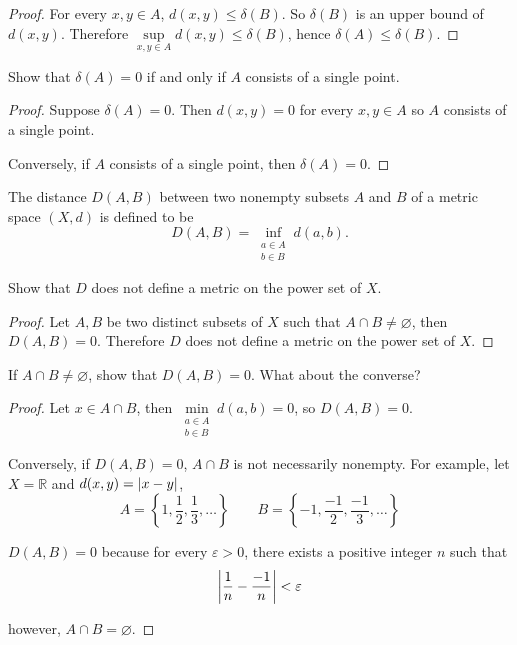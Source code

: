 \begin{proof}
    For every $x, y\in A$, $d(x, y) \leq \delta(B)$. So $\delta(B)$ is an upper bound of $d(x, y)$. Therefore $\sup\limits_{x,y\in A} d(x, y)\leq \delta(B)$, hence $\delta(A)\leq \delta(B)$.
\end{proof}

\begin{exercise}\label{chapter1:section2:exercise7}
    Show that $\delta(A) = 0$ if and only if $A$ consists of a single point.
\end{exercise}

\begin{proof}
    Suppose $\delta(A) = 0$. Then $d(x, y) = 0$ for every $x, y\in A$ so $A$ consists of a single point.

    Conversely, if $A$ consists of a single point, then $\delta(A) = 0$.
\end{proof}

\begin{exercise}\label{chapter1:section2:exercise8}
    The distance $D(A, B)$ between two nonempty subsets $A$ and $B$ of a metric space $(X, d)$ is defined to be
    \[
        D(A, B) = \inf\limits_{\substack{a\in A \\ b\in B}}d(a, b).
    \]

    Show that $D$ does not define a metric on the power set of $X$.
\end{exercise}

\begin{proof}
    Let $A, B$ be two distinct subsets of $X$ such that $A\cap B\ne \varnothing$, then $D(A, B) = 0$. Therefore $D$ does not define a metric on the power set of $X$.
\end{proof}

\begin{exercise}\label{chapter1:section2:exercise9}
    If $A\cap B \ne \varnothing$, show that $D(A, B) = 0$. What about the converse?
\end{exercise}

\begin{proof}
    Let $x\in A\cap B$, then $\min\limits_{\substack{a\in A \\ b\in B}}d(a, b) = 0$, so $D(A, B) = 0$.

    Conversely, if $D(A, B) = 0$, $A\cap B$ is not necessarily nonempty. For example, let $X = \mathbb{R}$ and $d(x, y) = \left\vert{x - y}\right\vert$,
    \[
        A = \left\{ 1, \frac{1}{2}, \frac{1}{3}, \ldots \right\}\qquad B = \left\{ -1, \frac{-1}{2}, \frac{-1}{3}, \ldots \right\}
    \]

    $D(A, B) = 0$ because for every $\varepsilon > 0$, there exists a positive integer $n$ such that
    \[
        \left\vert{\frac{1}{n} - \frac{-1}{n}}\right\vert < \varepsilon
    \]

    however, $A\cap B = \varnothing$.
\end{proof}

